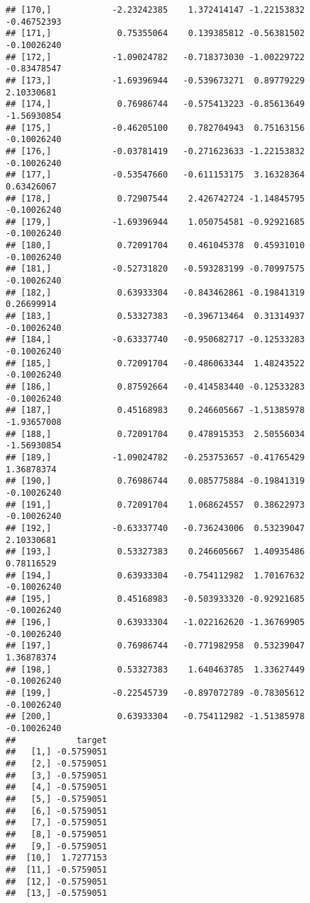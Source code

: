 \documentclass[
]{article}
\begin{document}
\begin{verbatim}
## [170,]            -2.23242385    1.372414147 -1.22153832    -0.46752393
## [171,]             0.75355064    0.139385812 -0.56381502    -0.10026240
## [172,]            -1.09024782   -0.718373030 -1.00229722    -0.83478547
## [173,]            -1.69396944   -0.539673271  0.89779229     2.10330681
## [174,]             0.76986744   -0.575413223 -0.85613649    -1.56930854
## [175,]            -0.46205100    0.782704943  0.75163156    -0.10026240
## [176,]            -0.03781419   -0.271623633 -1.22153832    -0.10026240
## [177,]            -0.53547660   -0.611153175  3.16328364     0.63426067
## [178,]             0.72907544    2.426742724 -1.14845795    -0.10026240
## [179,]            -1.69396944    1.050754581 -0.92921685    -0.10026240
## [180,]             0.72091704    0.461045378  0.45931010    -0.10026240
## [181,]            -0.52731820   -0.593283199 -0.70997575    -0.10026240
## [182,]             0.63933304   -0.843462861 -0.19841319     0.26699914
## [183,]             0.53327383   -0.396713464  0.31314937    -0.10026240
## [184,]            -0.63337740   -0.950682717 -0.12533283    -0.10026240
## [185,]             0.72091704   -0.486063344  1.48243522    -0.10026240
## [186,]             0.87592664   -0.414583440 -0.12533283    -0.10026240
## [187,]             0.45168983    0.246605667 -1.51385978    -1.93657008
## [188,]             0.72091704    0.478915353  2.50556034    -1.56930854
## [189,]            -1.09024782   -0.253753657 -0.41765429     1.36878374
## [190,]             0.76986744    0.085775884 -0.19841319    -0.10026240
## [191,]             0.72091704    1.068624557  0.38622973    -0.10026240
## [192,]            -0.63337740   -0.736243006  0.53239047     2.10330681
## [193,]             0.53327383    0.246605667  1.40935486     0.78116529
## [194,]             0.63933304   -0.754112982  1.70167632    -0.10026240
## [195,]             0.45168983   -0.503933320 -0.92921685    -0.10026240
## [196,]             0.63933304   -1.022162620 -1.36769905    -0.10026240
## [197,]             0.76986744   -0.771982958  0.53239047     1.36878374
## [198,]             0.53327383    1.640463785  1.33627449    -0.10026240
## [199,]            -0.22545739   -0.897072789 -0.78305612    -0.10026240
## [200,]             0.63933304   -0.754112982 -1.51385978    -0.10026240
##            target
##   [1,] -0.5759051
##   [2,] -0.5759051
##   [3,] -0.5759051
##   [4,] -0.5759051
##   [5,] -0.5759051
##   [6,] -0.5759051
##   [7,] -0.5759051
##   [8,] -0.5759051
##   [9,] -0.5759051
##  [10,]  1.7277153
##  [11,] -0.5759051
##  [12,] -0.5759051
##  [13,] -0.5759051

\end{verbatim}
\end{document}
